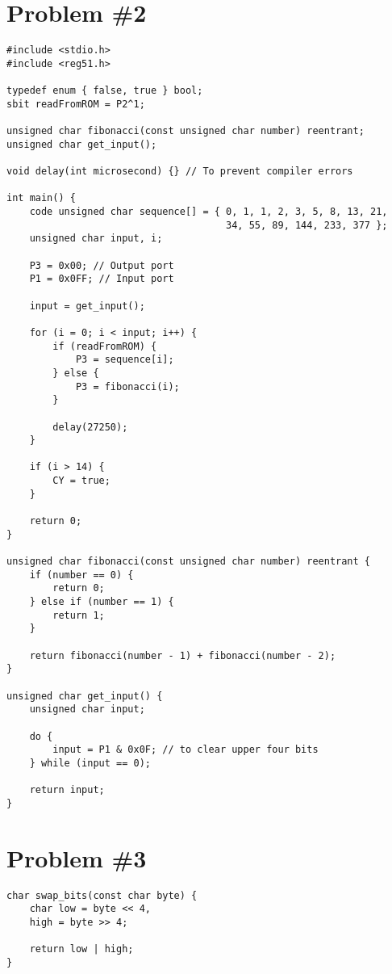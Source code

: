 \documentclass[12pt]{article}
\begin{document}
\section{Problem \#2}
\begin{verbatim}
#include <stdio.h>
#include <reg51.h>

typedef enum { false, true } bool;
sbit readFromROM = P2^1;

unsigned char fibonacci(const unsigned char number) reentrant;
unsigned char get_input();

void delay(int microsecond) {} // To prevent compiler errors

int main() {
    code unsigned char sequence[] = { 0, 1, 1, 2, 3, 5, 8, 13, 21,
                                      34, 55, 89, 144, 233, 377 };
    unsigned char input, i;

    P3 = 0x00; // Output port
    P1 = 0x0FF; // Input port

    input = get_input();

    for (i = 0; i < input; i++) {
        if (readFromROM) {
            P3 = sequence[i];
        } else {
            P3 = fibonacci(i);
        }

        delay(27250);
    }

    if (i > 14) {
        CY = true;
    }

    return 0;
}

unsigned char fibonacci(const unsigned char number) reentrant {
    if (number == 0) {
        return 0;
    } else if (number == 1) {
        return 1;
    }

    return fibonacci(number - 1) + fibonacci(number - 2);
}

unsigned char get_input() {
    unsigned char input;

    do {
        input = P1 & 0x0F; // to clear upper four bits
    } while (input == 0);

    return input;
}
\end{verbatim}

\section{Problem \#3}
\begin{verbatim}
char swap_bits(const char byte) {
    char low = byte << 4,
    high = byte >> 4;

    return low | high;
}
\end{verbatim}
\end{document}
